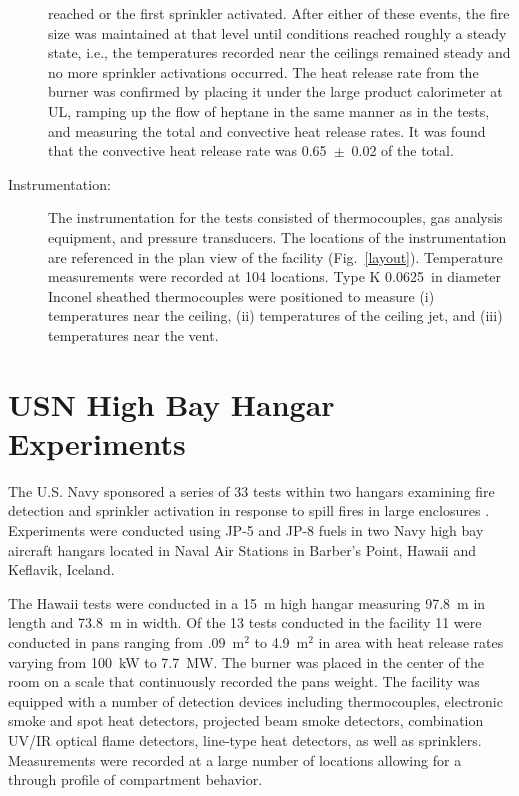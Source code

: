 \begin{description}
reached or the first sprinkler activated. After either of these events, the fire size was maintained at that level until conditions reached roughly a
steady state, i.e., the temperatures recorded near the ceilings remained steady and no more sprinkler activations occurred.
The heat release rate from the burner was confirmed by placing it under the large product calorimeter at UL, ramping up the flow of heptane in the
same manner as in the tests, and measuring the total and convective heat release rates. It was found that the convective heat release rate was
0.65~$\pm$~0.02 of the total.
\item[Instrumentation:] The instrumentation for the tests consisted of thermocouples, gas analysis equipment, and pressure transducers. The locations of the instrumentation
are referenced in the plan view of the facility (Fig.~\ref{layout}).
Temperature measurements were recorded at 104 locations. Type K 0.0625~in diameter Inconel sheathed thermocouples were positioned to measure (i)
temperatures near the ceiling, (ii) temperatures of the ceiling jet, and (iii) temperatures near the vent.
\end{description}

\section{USN High Bay Hangar Experiments}

The U.S. Navy sponsored a series of 33 tests within two hangars examining fire detection and sprinkler activation in response to spill fires in large enclosures \cite{Gott:1997, Davis:2000}. Experiments were conducted using JP-5 and JP-8 fuels in two Navy high bay aircraft hangars located in Naval Air Stations in Barber's Point, Hawaii and Keflavik, Iceland.

The Hawaii tests were conducted in a 15~m high hangar measuring 97.8~m in length and 73.8~m in width. Of the 13 tests conducted in the facility 11 were conducted in pans ranging from .09~m$^2$ to 4.9~m$^2$ in area with heat release rates varying from 100~kW to 7.7~MW. The burner was placed in the center of the room on a scale that continuously recorded the pans weight. The facility was equipped with a number of detection devices including thermocouples, electronic smoke and spot heat detectors, projected beam smoke detectors, combination UV/IR optical flame detectors, line-type heat detectors, as well as sprinklers. Measurements were recorded at a large number of locations allowing for a through profile of compartment behavior.

